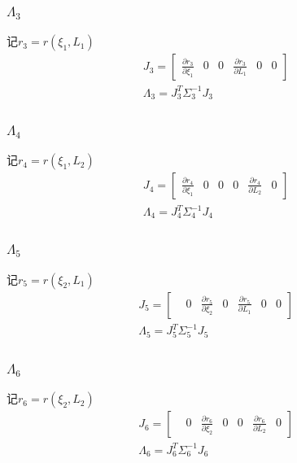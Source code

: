 \documentclass[UTF8]{ctexart}
\begin{document}
\subsubsection{$\Lambda_3$}
\indent 记$r_3=r(\xi _1,L _1)$ \\
\begin{equation}
\begin{aligned}
&J_3= \begin{bmatrix}
     \frac{\partial r_3}{\partial \xi _1} &0 &0 &\frac{\partial r_3}{\partial L_1} &0 &0 
    \end{bmatrix}\\
&\Lambda_3=J_3^T\Sigma_3^{-1}J_3
\end{aligned}
\end{equation}

\subsubsection{$\Lambda_4$}
\indent 记$r_4=r(\xi _1,L _2)$ \\
\begin{equation}
\begin{aligned}
&J_4= \begin{bmatrix}
    \frac{\partial r_4}{\partial \xi _1} &0 &0 &0 &\frac{\partial r_4}{\partial L_2} &0 
    \end{bmatrix}\\
&\Lambda_4=J_4^T\Sigma_4^{-1}J_4
\end{aligned}
\end{equation}

\subsubsection{$\Lambda_5$}
\indent 记$r_5=r(\xi _2,L _1)$ \\
\begin{equation}
\begin{aligned}
&J_5= \begin{bmatrix}
    &0 &\frac{\partial r_5}{\partial \xi _2} &0  &\frac{\partial r_5}{\partial L_1} &0 &0
    \end{bmatrix}\\
&\Lambda_5=J_5^T\Sigma_5^{-1}J_5
\end{aligned}
\end{equation}

\subsubsection{$\Lambda_6$}
\indent 记$r_6=r(\xi _2,L _2)$ \\
\begin{equation}
\begin{aligned}
&J_6= \begin{bmatrix}
    &0 &\frac{\partial r_6}{\partial \xi _2} &0 &0 &\frac{\partial r_6}{\partial L_2} &0 
    \end{bmatrix}\\
&\Lambda_6=J_6^T\Sigma_6^{-1}J_6
\end{aligned}
\end{equation}
\end{document}
